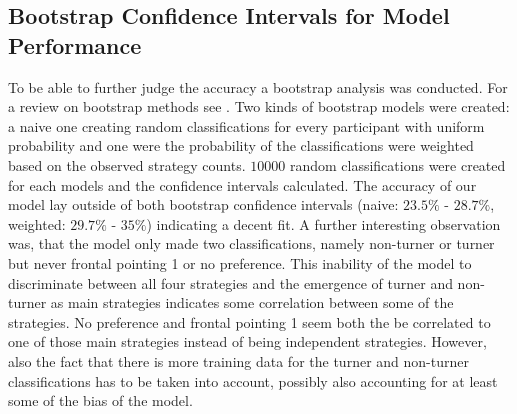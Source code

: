 \documentclass{frontiersSCNS} %
\begin{document}
 


\subsection{Bootstrap Confidence Intervals for Model Performance}
To be able to further judge the accuracy a bootstrap analysis was conducted. For a review on bootstrap methods see \citep{Efron1986}. Two kinds of bootstrap models were created: a naive one creating random classifications for every participant with uniform probability and one were the probability of the classifications were weighted based on the observed strategy counts. $10000$ random classifications were created for each models and the confidence intervals calculated. The accuracy of our model lay outside of both bootstrap confidence intervals (naive: $23.5\%$ - $28.7\%$, weighted: $29.7\%$ - $35\%$) indicating a decent fit.
A further interesting observation was, that the model only made two classifications, namely non-turner or turner but never frontal pointing 1 or no preference. This inability of the model to discriminate between all four strategies and the emergence of turner and non-turner as main strategies indicates some correlation between some of the strategies. No preference and frontal pointing 1 seem both the be correlated to one of those main strategies instead of being independent strategies. However, also the fact that there is more training data for the turner and non-turner classifications has to be taken into account, possibly also accounting for at least some of the bias of the model.
\end{document}
